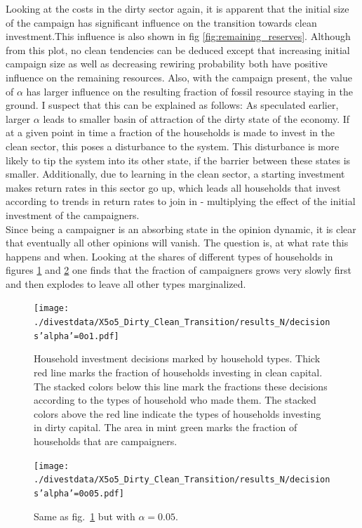 Looking at the costs in the dirty sector again, it is apparent that the initial size of the campaign has significant influence on the transition towards clean investment.This influence is also shown in fig \ref{fig:remaining_reserves}. Although from this plot, no clean tendencies can be deduced except that increasing initial campaign size as well as decreasing rewiring probability both have positive influence on the remaining resources.
Also, with the campaign present, the value of $\alpha$ has larger influence on the resulting fraction of fossil resource staying in the ground. I suspect that this can be explained as follows: As speculated earlier, larger $\alpha$ leads to smaller basin of attraction of the dirty state of the economy. If at a given point in time a fraction of the households is made to invest in the clean sector, this poses a disturbance to the system. This disturbance is more likely to tip the system into its other state, if the barrier between these states is smaller. Additionally, due to learning in the clean sector, a starting investment makes return rates in this sector go up, which leads all households that invest according to trends in return rates to join in - multiplying the effect of the initial investment of the campaigners.\\
Since being a campaigner is an absorbing state in the opinion dynamic, it is clear that eventually all other opinions will vanish. The question is, at what rate this happens and when. Looking at the shares of different types of households in figures \ref{fig:campaign_decisions0o1} and \ref{fig:campaign_decisions0o05} one finds that the fraction of campaigners grows very slowly first and then explodes to leave all other types marginalized.\\
\begin{figure}[H]
	\centering
	\texttt{[image: ./divestdata/X5o5\_Dirty\_Clean\_Transition/results\_N/decisions'alpha'=0o1.pdf]}
	\caption{Household investment decisions marked by household types. Thick red line marks the fraction of households investing in clean capital. The stacked colors below this line mark the fractions these decisions according to the types of household who made them. The stacked colors above the red line indicate the types of households investing in dirty capital. The area in mint green marks the fraction of households that are campaigners.}
	\label{fig:campaign_decisions0o1}
\end{figure}
\begin{figure}[H]
	\centering
	\texttt{[image: ./divestdata/X5o5\_Dirty\_Clean\_Transition/results\_N/decisions'alpha'=0o05.pdf]}
	\caption{Same as fig.~\ref{fig:campaign_decisions0o1} but with $\alpha = 0.05$.}
	\label{fig:campaign_decisions0o05}
\end{figure}


